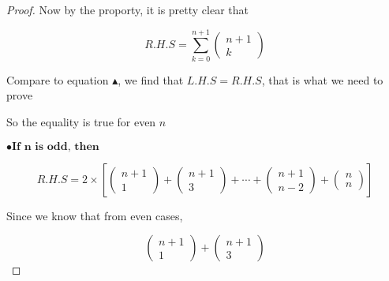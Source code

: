 \documentclass[12pt]{article}
\begin{document}
\begin{proof}
    \vspace*{0.3cm}
    \hspace*{1.2cm}
    Now by the proporty, it is pretty clear that

    \[ R.H.S = \sum_{k=0}^{n+1} \begin{pmatrix}
        n+1 \\
        k
    \end{pmatrix} \]

    \vspace*{0.3cm}
    \hspace*{1.2cm}
    Compare to equation $\blacktriangle$, we find that $L.H.S = R.H.S$, that is what we need to prove

    \vspace*{0.3cm}
    \hspace*{1.2cm}
    So the equality is true for even $n$

    \vspace*{0.3cm}
    \hspace*{1.2cm}
    $\bullet \textbf{If n is odd, then}$

    \[ R.H.S = 2 \times \left[ \begin{pmatrix}
        n+1  \\
        1
    \end{pmatrix}  + \begin{pmatrix}
              n+1 \\
              3
          
          \end{pmatrix} + \cdots + \begin{pmatrix}
                                       n+1 \\
                                       n-2 
    
          \end{pmatrix} 
          + \begin{pmatrix}
                              n \\
                              n
          \end{pmatrix} \right]  \]

    \vspace*{0.3cm}
    \hspace*{1.2cm}
    Since we know that from even cases,

    \[ \begin{pmatrix}
        n+1  \\
        1
    \end{pmatrix}  + \begin{pmatrix}
              n+1 \\
              3
          

\end{pmatrix}\]
\end{proof}
\end{document}
